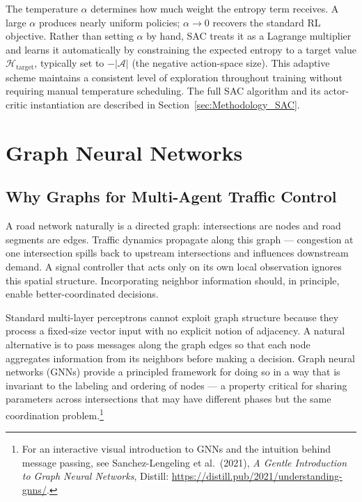 The temperature $\alpha$ determines how much weight the entropy term receives. A large $\alpha$ produces nearly uniform policies; $\alpha \rightarrow 0$ recovers the standard RL objective. Rather than setting $\alpha$ by hand, SAC \citep{haarnoja2018soft} treats it as a Lagrange multiplier and learns it automatically by constraining the expected entropy to a target value $\mathcal{H}_{\mathrm{target}}$, typically set to $-|\mathcal{A}|$ (the negative action-space size). This adaptive scheme maintains a consistent level of exploration throughout training without requiring manual temperature scheduling. The full SAC algorithm and its actor-critic instantiation are described in Section~\ref{sec:Methodology_SAC}.

\section{Graph Neural Networks}
\label{sec:TheoreticalBackground_GNN}

\subsection{Why Graphs for Multi-Agent Traffic Control}
\label{sec:TheoreticalBackground_WhyGNN}

A road network naturally is a directed graph: intersections are nodes and road segments are edges. Traffic dynamics propagate along this graph — congestion at one intersection spills back to upstream intersections and influences downstream demand. A signal controller that acts only on its own local observation ignores this spatial structure. Incorporating neighbor information should, in principle, enable better-coordinated decisions.

Standard multi-layer perceptrons cannot exploit graph structure because they process a fixed-size vector input with no explicit notion of adjacency. A natural alternative is to pass messages along the graph edges so that each node aggregates information from its neighbors before making a decision. Graph neural networks (GNNs) provide a principled framework for doing so in a way that is invariant to the labeling and ordering of nodes — a property critical for sharing parameters across intersections that may have different phases but the same coordination problem.\footnote{For an interactive visual introduction to GNNs and the intuition behind message passing, see Sanchez-Lengeling et al.\ (2021), \emph{A Gentle Introduction to Graph Neural Networks}, Distill: \url{https://distill.pub/2021/understanding-gnns/}.}

